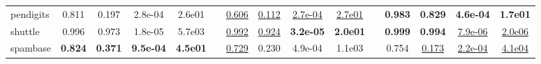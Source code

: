 \documentclass[9pt]{beamer}
\begin{document}
\begin{frame}
\begin{table}[!ht]
{\begin{tabular}{l cccc c cccc c cccc}
pendigits    &0.811 &0.197 &2.8e-04&2.6e01 & &\underline{0.606} &\underline{0.112} &\underline{2.7e-04}&\underline{2.7e01}   & &\bf 0.983 &\bf 0.829 &\bf 4.6e-04&\bf 1.7e01 \\
shuttle      &0.996 &0.973 &1.8e-05&5.7e03 & &\underline{0.992} &\underline{0.924} &\bf 3.2e-05&\bf 2.0e01   & &\bf 0.999 &\bf 0.994 &\underline{7.9e-06}&\underline{2.0e06} \\
spambase     &\bf 0.824 &\bf 0.371 &\bf 9.5e-04&\bf 4.5e01&  &\underline{0.729} &0.230 &4.9e-04&1.1e03  &  &0.754 &\underline{0.173} &\underline{2.2e-04}&\underline{4.1e04} \\
\bottomrule
\end{tabular}
}
\end{table}

\end{frame}
\end{document}
